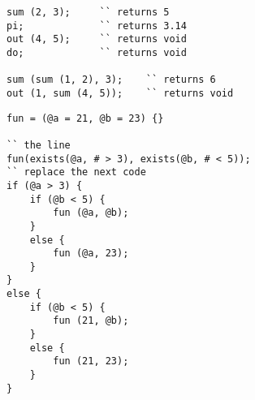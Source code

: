 \begin{lstlisting}[caption=Вызов функций, label=callfunc]
sum (2, 3); 	`` returns 5
pi;				`` returns 3.14
out (4, 5); 	`` returns void
do;				`` returns void

sum (sum (1, 2), 3);	`` returns 6
out (1, sum (4, 5));	`` returns void
\end{lstlisting}

\begin{lstlisting}[caption=Значения по умольчанию, label=defaultparametrs]
fun = (@a = 21, @b = 23) {}

`` the line 
fun(exists(@a, # > 3), exists(@b, # < 5));
`` replace the next code
if (@a > 3) {
	if (@b < 5) {
		fun (@a, @b);
	}
	else {
		fun (@a, 23);
	}
}
else {
	if (@b < 5) {
		fun (21, @b);
	}
	else {
		fun (21, 23);
	}
}
\end{lstlisting}

